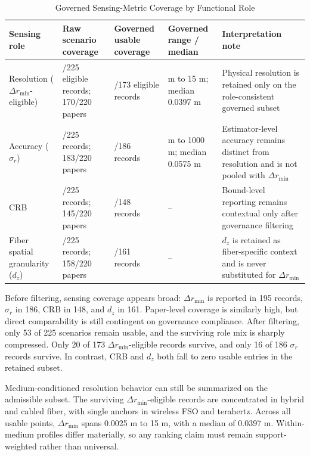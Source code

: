 \begin{table}[!t]
\caption{Governed Sensing-Metric Coverage by Functional Role}
\label{tab:tradeoff-sensing}
\centering
\scriptsize
\setlength{\tabcolsep}{3.5pt}
\begin{tabularx}{\textwidth}{>{\raggedright\arraybackslash}p{} >{\raggedright\arraybackslash}p{} >{\raggedright\arraybackslash}p{} >{\raggedright\arraybackslash}p{} >{\raggedright\arraybackslash}X}
\toprule
\textbf{Sensing role} & \textbf{Raw scenario coverage} & \textbf{Governed usable coverage} & \textbf{Governed range / median} & \textbf{Interpretation note} \\
\midrule
Resolution ($\Delta r_{\min}$-eligible) & 173/225 eligible records; 170/220 papers & 20/173 eligible records & 0.0025 m to 15 m; median 0.0397 m & Physical resolution is retained only on the role-consistent governed subset \\
Accuracy ($\sigma_r$) & 186/225 records; 183/220 papers & 16/186 records & 0.001 m to 1000 m; median 0.0575 m & Estimator-level accuracy remains distinct from resolution and is not pooled with $\Delta r_{\min}$ \\
CRB & 148/225 records; 145/220 papers & 0/148 records & -- & Bound-level reporting remains contextual only after governance filtering \\
Fiber spatial granularity ($d_z$) & 161/225 records; 158/220 papers & 0/161 records & -- & $d_z$ is retained as fiber-specific context and is never substituted for $\Delta r_{\min}$ \\
\bottomrule
\end{tabularx}
\end{table}

Before filtering, sensing coverage appears broad: $\Delta r_{\min}$ is reported in 195 records, $\sigma_r$ in 186, CRB in 148, and $d_z$ in 161. Paper-level coverage is similarly high, but direct comparability is still contingent on governance compliance. After filtering, only 53 of 225 scenarios remain usable, and the surviving role mix is sharply compressed. Only 20 of 173 $\Delta r_{\min}$-eligible records survive, and only 16 of 186 $\sigma_r$ records survive. In contrast, CRB and $d_z$ both fall to zero usable entries in the retained subset.

Medium-conditioned resolution behavior can still be summarized on the admissible subset. The surviving $\Delta r_{\min}$-eligible records are concentrated in hybrid and cabled fiber, with single anchors in wireless FSO and terahertz. Across all usable points, $\Delta r_{\min}$ spans 0.0025 m to 15 m, with a median of 0.0397 m. Within-medium profiles differ materially, so any ranking claim must remain support-weighted rather than universal.

